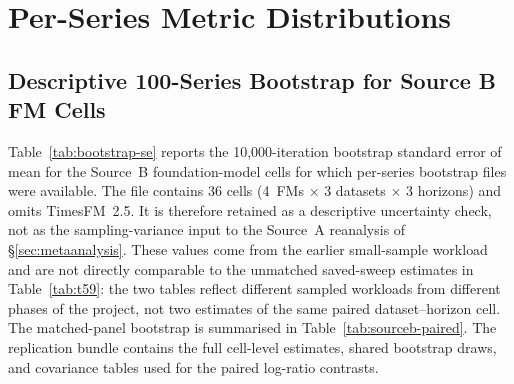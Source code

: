 \section{Per-Series Metric Distributions}\label{app:metrics}

\subsection{Descriptive 100-Series Bootstrap for Source B FM Cells}

Table~\ref{tab:bootstrap-se} reports the 10{,}000-iteration bootstrap
standard error of mean \WAPE{} for the Source~B
foundation-model cells for which per-series bootstrap files were
available.  The file
contains 36 cells (4~FMs $\times$ 3 datasets $\times$ 3 horizons) and
omits TimesFM~2.5.  It is therefore retained as a descriptive uncertainty
check, not as the sampling-variance input to the Source~A reanalysis
of \S\ref{sec:metaanalysis}.  These values come from the earlier small-sample workload and are
not directly comparable to the unmatched saved-sweep estimates in
Table~\ref{tab:t59}: the two tables reflect different sampled workloads from
different phases of the project, not two estimates of the same paired
dataset--horizon cell. The matched-panel bootstrap is summarised in
Table~\ref{tab:sourceb-paired}. The replication bundle contains the full
cell-level estimates, shared bootstrap draws, and covariance tables used for
the paired log-ratio contrasts.


